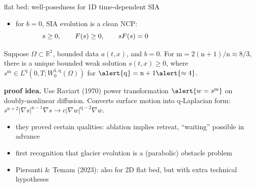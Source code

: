 \documentclass[aspectratio=169,10pt]{beamer}
\newcommand{\RR}{{\mathbb{R}}}
\newcommand{\mm}{\mathrm{m}}
\newcommand{\nn}{\mathrm{n}}
\newcommand{\qq}{\mathrm{q}}
\newcommand{\grad}{\nabla}
\newcommand{\Div}{\nabla\cdot}
\begin{document}
\begin{frame}{flat bed: well-posedness for 1D time-dependent SIA}

\begin{itemize}
\item for $b=0$, SIA evolution is a clean NCP:
    $$s\ge 0, \qquad F(s)\ge 0, \qquad s F(s) = 0 \hspace{40mm}$$

\vspace{-8mm}
\hfill \grey{\scriptsize $\displaystyle \left[F(s) = \frac{\partial s}{\partial t} - \Div\left(\gamma_0 (s-b)^{\nn+2} |\grad s|^{\nn-1}\grad s\right) - a\right]$}
\end{itemize}

\medskip
\begin{theorem}
Suppose $\Omega\subset\RR^1$, bounded data $a(t,x)$, and $b=0$.  For $\mm=2(\nn+1)/\nn \approx 8/3$, there is a unique bounded weak solution $s(t,x) \ge 0$, where \alert{$s^\mm \in L^\qq(0,T;W_0^{1,\qq}(\Omega))$ } for $\alert{\qq}=\nn+1\alert{\approx 4}$.
\end{theorem}

{\small
\noindent \textbf{proof idea.} Use Raviart (1970) power transformation $\alert{w=s^\mm}$ on doubly-nonlinear diffusion.  Converts surface motion into \alert{$\qq$-Laplacian} form:\, $\displaystyle s^{\nn+2} |\grad s|^{\nn-1}\grad s \to c |\grad w|^{\qq-2}\grad w$.
}

\pause
\medskip
\begin{itemize}
\item they proved certain qualities: ablation implies retreat, ``waiting'' possible in advance
\item first recognition that \alert{glacier evolution is a (parabolic) obstacle problem}
\item Piersanti \& Temam (2023): also for 2D flat bed, but with extra technical hypotheses
\end{itemize}
\end{frame}
\end{document}
